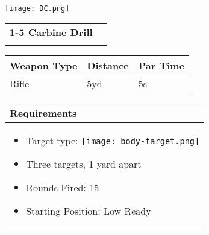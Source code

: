 \documentclass[../Cover.tex]{subfiles}
\begin{document}
	\begin{minipage}[t][0.2\textheight][t]{0.1\textwidth} 
		\texttt{[image: DC.png]}
	\end{minipage}
	\hfill
	\begin{minipage}[t][0.2\textheight][t]{0.8\textwidth}
		\begin{tabular}{ p{} l  }		
			\\	
			\small \textbf{1-5 Carbine Drill} \\
			\\[0.09\textheight]
		\end{tabular}
		\quad
		\begin{tabular}{ | p{} | p{} | p{} |}
			\hline
			\tiny Weapon Type & \tiny Distance & \tiny Par Time\\ 
			\hline
			\tiny Rifle & \tiny 5yd & \tiny 5s \\ %
			\hline
		\end{tabular}
	\end{minipage}
	\begin{tabular}{p{}}
		\small Requirements \\
		\hline
		\tiny \begin{itemize} %
			\item Target type: \texttt{[image: body-target.png]}
			\item Three targets, 1 yard apart			
			\item Rounds Fired: 15
			\item Starting Position: Low Ready
		\end{itemize}				
		\\[0.6\textheight]
	\end{tabular}
\end{document}
